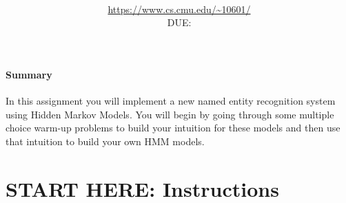 \documentclass[11pt,addpoints,answers]{exam}
\title{\textsc{\hwName}
} %
\author{\courseName\\
\url{https://www.cs.cmu.edu/~10601/} \\
DUE: \dueDate{} \\ 
}
\date{}
\date{}
\begin{document}
\maketitle

\begin{notebox}
\paragraph{Summary} In this assignment you will implement a new named entity recognition system using Hidden Markov Models. You will begin by going through some multiple choice warm-up problems to build your intuition for these models and then use that intuition to build your own HMM models.
\end{notebox}\section*{START HERE: Instructions}
\end{document}
